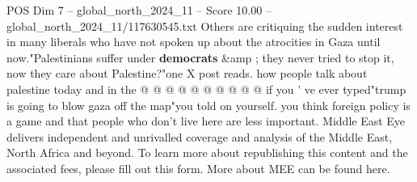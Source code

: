 \begin{textsample}{POS Dim 7 – global\_north\_2024\_11 – Score 10.00 – global\_north\_2024\_11/117630545.txt}
Others are critiquing the sudden interest in many liberals who have not spoken up about the atrocities in Gaza until now."Palestinians suffer under \textbf{democrats} \&amp ; they never tried to stop it, now they care about Palestine?"one X post reads. how people talk about palestine today and in the @ @ @ @ @ @ @ @ @ @ if you ' ve ever typed"trump is going to blow gaza off the map"you told on yourself. you think foreign policy is a game and that people who don't live here are less important.
Middle East Eye delivers independent and unrivalled coverage and analysis of the Middle East, North Africa and beyond.
To learn more about republishing this content and the associated fees, please fill out this form.
More about MEE can be found here.

\end{textsample}

